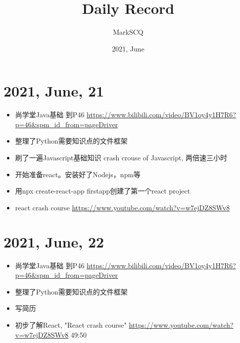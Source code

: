 \documentclass[UTF8]{article}
\title{Daily Record}
\author{MarkSCQ}
\date{2021, June}
\begin{document}
\maketitle

\tableofcontents

\newpage
\section{2021, June, 21}
\begin{itemize}
    \setlength\itemsep{0em}
    \item 尚学堂Java基础 到P46 \url{https://www.bilibili.com/video/BV1oy4y1H7R6?p=46&spm_id_from=pageDriver}
    \item 整理了Python需要知识点的文件框架
    \item 刷了一遍Javascript基础知识 crash crouse of Javascript, 两倍速三小时
    \item 开始准备react。安装好了Nodejs，npm等
    \item 用npx create-react-app firstapp创建了第一个react project
    \item react crash course \url{https://www.youtube.com/watch?v=w7ejDZ8SWv8} 
\end{itemize}
\section{2021, June, 22}
\begin{itemize}
    \setlength\itemsep{0em}
    \item 尚学堂Java基础 到P46 \url{https://www.bilibili.com/video/BV1oy4y1H7R6?p=46&spm_id_from=pageDriver}
    \item 整理了Python需要知识点的文件框架
    \item 写简历
    \item 初步了解React, "React crash course" \url{https://www.youtube.com/watch?v=w7ejDZ8SWv8} 49:50
\end{itemize}
\end{document}
